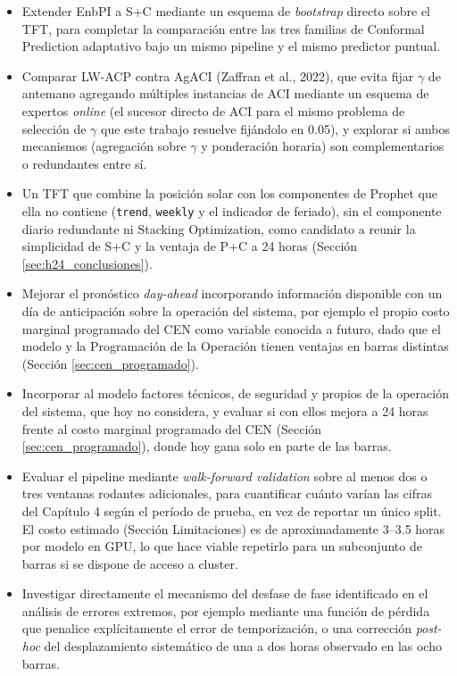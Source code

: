\begin{itemize}
    \item Extender EnbPI a S+C mediante un esquema de \textit{bootstrap} directo sobre el TFT, para completar la comparación entre las tres familias de Conformal Prediction adaptativo bajo un mismo pipeline y el mismo predictor puntual.
    \item Comparar LW-ACP contra AgACI (Zaffran et al., 2022), que evita fijar $\gamma$ de antemano agregando múltiples instancias de ACI mediante un esquema de expertos \textit{online} (el sucesor directo de ACI para el mismo problema de selección de $\gamma$ que este trabajo resuelve fijándolo en 0.05), y explorar si ambos mecanismos (agregación sobre $\gamma$ y ponderación horaria) son complementarios o redundantes entre sí.
    \item Un TFT que combine la posición solar con los componentes de Prophet que ella no contiene (\texttt{trend}, \texttt{weekly} y el indicador de feriado), sin el componente diario redundante ni Stacking Optimization, como candidato a reunir la simplicidad de S+C y la ventaja de P+C a 24 horas (Sección \ref{sec:h24_conclusiones}).
    \item Mejorar el pronóstico \textit{day-ahead} incorporando información disponible con un día de anticipación sobre la operación del sistema, por ejemplo el propio costo marginal programado del CEN como variable conocida a futuro, dado que el modelo y la Programación de la Operación tienen ventajas en barras distintas (Sección \ref{sec:cen_programado}).
    \item Incorporar al modelo factores técnicos, de seguridad y propios de la operación del sistema, que hoy no considera, y evaluar si con ellos mejora a 24 horas frente al costo marginal programado del CEN (Sección \ref{sec:cen_programado}), donde hoy gana solo en parte de las barras.
    \item Evaluar el pipeline mediante \textit{walk-forward validation} sobre al menos dos o tres ventanas rodantes adicionales, para cuantificar cuánto varían las cifras del Capítulo 4 según el período de prueba, en vez de reportar un único split. El costo estimado (Sección Limitaciones) es de aproximadamente 3--3.5 horas por modelo en GPU, lo que hace viable repetirlo para un subconjunto de barras si se dispone de acceso a cluster.
    \item Investigar directamente el mecanismo del desfase de fase identificado en el análisis de errores extremos, por ejemplo mediante una función de pérdida que penalice explícitamente el error de temporización, o una corrección \textit{post-hoc} del desplazamiento sistemático de una a dos horas observado en las ocho barras.

\end{itemize}
